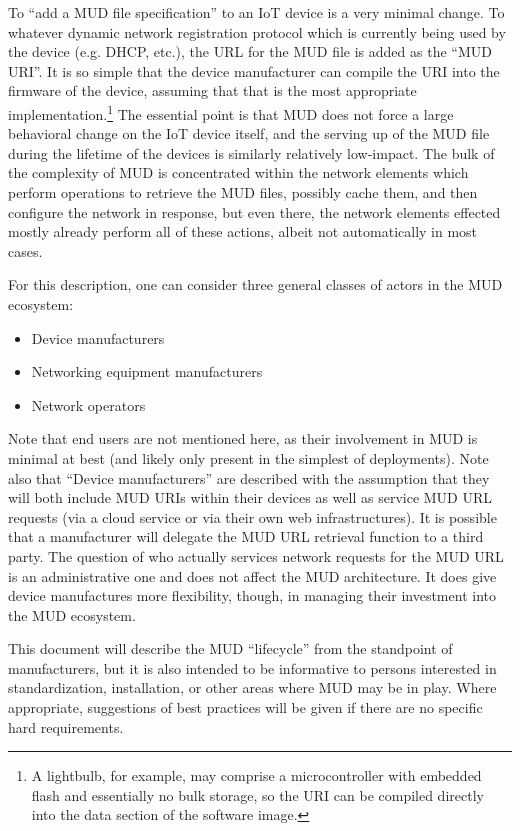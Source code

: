 \documentclass[conference]{IEEEtran}
\begin{document}
To ``add a MUD file specification'' to an IoT device is a very minimal
change.  To whatever dynamic network registration protocol which is
currently being used by the device (e.g. DHCP, etc.), the URL for the
MUD file is added as the ``MUD URI''.  It is so simple that the device
manufacturer can compile the URI into the firmware of the device,
assuming that that is the most appropriate implementation.\footnote{A
  lightbulb, for example, may comprise a microcontroller with embedded
  flash and essentially no bulk storage, so the URI can be compiled
  directly into the data section of the software image.}  The
essential point is that MUD does not force a large behavioral change
on the IoT device itself, and the serving up of the MUD file during
the lifetime of the devices is similarly relatively low-impact.  The
bulk of the complexity of MUD is concentrated within the network
elements which perform operations to retrieve the MUD files, possibly
cache them, and then configure the network in response, but even
there, the network elements effected mostly already perform all of
these actions, albeit not automatically in most cases.

For this description, one can consider three general
classes of actors in the MUD ecosystem:
\begin{itemize}
\item Device manufacturers
\item Networking equipment manufacturers
\item Network operators
\end{itemize}

Note that end users are not mentioned here, as their involvement in
MUD is minimal at best (and likely only present in the simplest of
deployments).  Note also that ``Device manufacturers'' are described
with the assumption that they will both include MUD URIs within their
devices as well as service MUD URL requests (via a cloud service or via
their own web infrastructures).  It is possible that a manufacturer
will delegate the MUD URL retrieval function to a third party.  The
question of who actually services network requests for the MUD URL is
an administrative one and does not affect the MUD architecture.  It
does give device manufactures more flexibility, though, in managing
their investment into the MUD ecosystem.

This document will describe the MUD ``lifecycle'' from the standpoint
of manufacturers, but it is also intended to be informative to persons
interested in standardization, installation, or other areas where MUD
may be in play.  Where appropriate, suggestions of best practices will
be given if there are no specific hard requirements.
\end{document}
